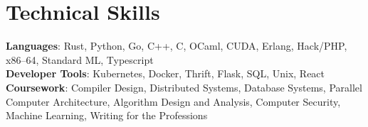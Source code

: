 \documentclass[letterpaper,11pt]{article}
\begin{document}
%
\section{Technical Skills}
 \begin{itemize}[leftmargin=0.15in, label={}]
    \small{\item{
     \textbf{Languages}{: Rust, Python, Go, C++, C, OCaml, CUDA, Erlang, Hack/PHP, x86–64, Standard ML, Typescript} \\
     \textbf{Developer Tools}{: Kubernetes, Docker, Thrift, Flask, SQL, Unix, React} \\
     \textbf{Coursework}{: Compiler Design, Distributed Systems, Database Systems, Parallel Computer Architecture, Algorithm Design and Analysis, Computer Security, Machine Learning, Writing for the Professions}
    }}
 \end{itemize}


\end{document}

